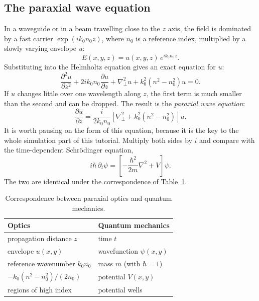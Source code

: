 \documentclass[11pt,a4paper]{article}
\begin{document}
\subsection{The paraxial wave equation}
In a waveguide or in a beam travelling close to the $z$ axis, the field is dominated by a fast carrier $\exp(ik_0 n_0 z)$, where $n_0$ is a reference index, multiplied by a slowly varying envelope $u$:
\begin{equation}
E(x,y,z) = u(x,y,z)\, e^{i k_0 n_0 z}.
\label{eq:envelope}
\end{equation}
Substituting into the Helmholtz equation gives an exact equation for $u$:
\begin{equation}
\frac{\partial^2 u}{\partial z^2} + 2 i k_0 n_0 \frac{\partial u}{\partial z}
+ \nabla_\perp^2 u + k_0^2 \left( n^2 - n_0^2 \right) u = 0.
\label{eq:exact_u}
\end{equation}
If $u$ changes little over one wavelength along $z$, the first term is much smaller than the second and can be dropped. The result is the \emph{paraxial wave equation}:
\begin{equation}
\frac{\partial u}{\partial z} = \frac{i}{2 k_0 n_0} \left[ \nabla_\perp^2 + k_0^2 \left( n^2 - n_0^2 \right) \right] u.
\label{eq:paraxial}
\end{equation}
It is worth pausing on the form of this equation, because it is the key to the whole simulation part of this tutorial. Multiply both sides by $i$ and compare with the time-dependent Schr\"odinger equation,
\begin{equation}
i\hbar\, \partial_t \psi = \left[ -\frac{\hbar^2}{2m}\nabla^2 + V \right]\psi.
\end{equation}
The two are identical under the correspondence of Table~\ref{tab:qm}.

\begin{table}[h]
\centering
\caption{Correspondence between paraxial optics and quantum mechanics.}
\label{tab:qm}
\begin{tabular}{@{}ll@{}}
\toprule
Optics & Quantum mechanics \\
\midrule
propagation distance $z$ & time $t$ \\
envelope $u(x,y)$ & wavefunction $\psi(x,y)$ \\
reference wavenumber $k_0 n_0$ & mass $m$ (with $\hbar = 1$) \\
$-k_0(n^2 - n_0^2)/(2n_0)$ & potential $V(x,y)$ \\
regions of high index & potential wells \\
\bottomrule
\end{tabular}
\end{table}
\end{document}
